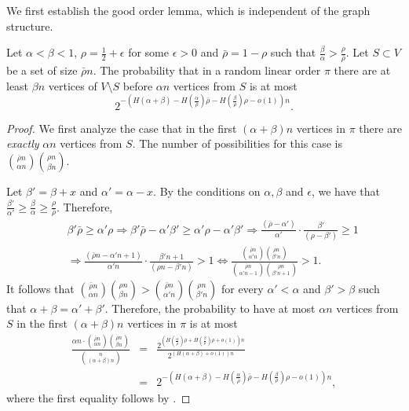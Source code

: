 We first establish the good order lemma, which is independent of the graph structure.

\begin{lemma} 
	Let $\alpha < \beta < 1$, $\rho= \frac{1}{2}+\epsilon$ for some $\epsilon>0$ %
	and $\bar{\rho}=1-\rho$ such that $\frac{\beta}{\alpha} > \frac{\rho}{\bar{\rho}}$. Let $S\subset V$ be a set of size $\bar{\rho}n$. The probability that in a random linear order $\pi$ there are at least $\beta n$ vertices of $V\setminus S$  before $\alpha n$ vertices from $S$ is at most $$2^{-(H(\alpha+\beta)-H(\frac{\alpha}{\bar{\rho}})\bar{\rho}-H(\frac{\beta}{{\rho}}){\rho}-o(1))n}.$$\label{lem:order}
\end{lemma}
\begin{proof}
	We first analyze the case that in the first $(\alpha+\beta)n$ vertices in $\pi$ there are \emph{exactly} $\alpha n$ vertices from $S$. The number of possibilities for this case is $\binom{\bar{\rho} n}{\alpha n}\binom{\rho n}{\beta n}$.
	
	Let $\beta' = \beta+x$ and $\alpha'=\alpha-x$. By the conditions on $\alpha,\beta$ and $\epsilon$, we have that $\frac{\beta'}{\alpha'}\geq\frac{\beta}{\alpha}\geq \frac{\rho}{\bar{\rho}}$. Therefore,
	\begin{eqnarray}
		& &  \beta'\bar{\rho}\geq \alpha'\rho\Rightarrow \beta'\bar{\rho}-\alpha'\beta'\geq \alpha'\rho-\alpha'\beta'\Rightarrow \frac{(\bar{\rho}-\alpha')}{\alpha'}\cdot \frac{\beta'}{(\rho-\beta')}\geq 1 \\
		& & \Rightarrow \frac{(\bar{\rho}n-\alpha'n+1)}{\alpha'n}\cdot \frac{\beta'n+1}{(\rho n-\beta'n)} > 1 \iff\frac{\binom{\bar{\rho} n}{\alpha' n}\binom{\rho n}{\beta' n}}{\binom{\bar{\rho} n}{\alpha' n-1}\binom{\rho n}{\beta' n+1}}>1.
	\end{eqnarray}
	It follows that
	$\binom{\bar{\rho}n}{\alpha n}\binom{\rho n}{\beta n}> \binom{\bar{\rho} n}{\alpha'n}\binom{\rho n}{\beta' n}$ for every $\alpha'< \alpha$  and $\beta'>\beta$ such that $\alpha+\beta=\alpha'+\beta'$. Therefore, the probability to have at most $\alpha n$ vertices from $S$ in the first $(\alpha+\beta)n$ vertices in $\pi$ is at most
	\begin{eqnarray}
		\frac{\alpha n\cdot \binom{\bar{\rho}n}{\alpha n}\binom{\rho n}{\beta n}}{\binom{n}{(\alpha+\beta)n}}&=&\frac{2^{(H(\frac{\alpha}{\bar{\rho}})\bar{\rho}+H(\frac{\beta}{{\rho}}){\rho}+o(1))n}}{2^{(H(\alpha+\beta)+o(1))n}}\\
		& = & 2^{-(H(\alpha+\beta)-H(\frac{\alpha}{\bar{\rho}})\bar{\rho}-H(\frac{\beta}{{\rho}}){\rho}-o(1))n},
	\end{eqnarray}
where the first equality follows
by  %
.
\end{proof}

